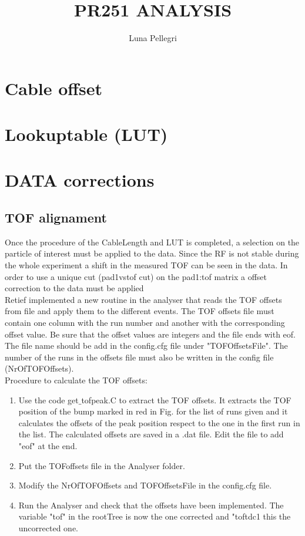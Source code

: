 \documentclass[]{report}
\title{PR251 ANALYSIS}
\author{Luna Pellegri}
\begin{document}
\maketitle

\chapter{Cable offset}
\chapter{Lookuptable (LUT)}
\chapter{DATA corrections}

\section{TOF alignament}
Once the procedure of the CableLength and LUT is completed, a selection on the particle of interest must be applied to the data. Since the RF is not stable during the whole experiment a shift in the measured TOF can be seen in the data. In order to use a unique cut (pad1vstof cut) on the pad1:tof matrix a offset correction to the data must be applied\\
Retief implemented a new routine in the analyser that reads the TOF offsets from file and apply them to the different events.
The TOF offsets file must contain one column with the run number and another with the corresponding offset value. Be sure that the offset values are integers and the file ends with eof.
The file name should be add in the config.cfg file under "TOFOffsetsFile". The number of the runs in the offsets file must also be written in the config file (NrOfTOFOffsets).\\
Procedure to calculate the TOF offsets:
\begin{enumerate}
	\item Use the code get$\_$tofpeak.C to extract the TOF offsets. It extracts the TOF position of the bump marked in red in Fig. for the list of runs given and it calculates the offsets of the peak position respect to the one in the first run in the list. The calculated offsets are saved in a .dat file. Edit the file to add "eof" at the end.
	\item Put the TOFoffsets file in the Analyser folder.
	\item Modify the NrOfTOFOffsets and TOFOffsetsFile in the config.cfg file.
	\item Run the Analyser and check that the offsets have been implemented. The variable "tof" in the rootTree is now the one corrected and "toftdc1 this the uncorrected one.
\end{enumerate}
\end{document}
